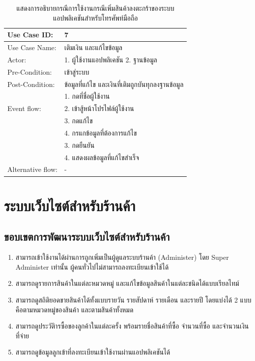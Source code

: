 \begin{table}[htbp]
  \centering
  \caption{แสดงการอธิบายกรณีการใช้งานกรณีเพิ่มสินค้าลงตะกร้าของระบบแอปพลิเคชันสำหรับโทรศัพท์มือถือ}
  \label{tab:example}
  \begin{tabularx}{\textwidth}{|p{3cm}|X|}
    \hline
    \multirow{1}{3cm}{Use Case ID:}      & 7                                   \\
    \hline
    \multirow{1}{3cm}{Use Case Name:}    & เติมเงิน และแก้ไขข้อมูล                  \\
    \hline
    \multirow{1}{3cm}{Actor:}            & 1. ผู้ใช้งานแอปพลิเคชัน 2. ฐานข้อมูล       \\
    \hline
    \multirow{1}{3cm}{Pre-Condition:}    & เข้าสู่ระบบ                            \\
    \hline
    \multirow{1}{3cm}{Post-Condition:}   & ข้อมูลที่แก้ไข และเงินที่เติมถูกบันทุกลงฐานข้อมูล \\
    \hline
    \multirow{3}{3cm}{Event flow:}       & 1. กดที่ชื่อผู้ใช้งาน                      \\
                                         & 2. เข้าสู้หน้าโปรไฟล์ผู้ใช้งาน              \\ & 3. กดแก้ไข \\
                                         & 4. กรแกข้อมูลที่ต้องการแก้ไข              \\ & 3. กดยืนยัน \\
                                         & 4. แสดงผลข้อมูลที่แก้ไขสำเร็จ              \\
    \hline
    \multirow{1}{3cm}{Alternative flow:} & -                                   \\
    \hline
  \end{tabularx}
\end{table}

\section{ระบบเว็บไซต์สำหรับร้านค้า}
\subsection{ขอบเขตการพัฒนาระบบเว็บไซต์สำหรับร้านค้า}
\begin{enumerate}
  \item สามารถเข้าใช้งานได้ผ่านการถูกเพิ่มเป็นผู้ดูแลระบบร้านค้า (Administer) โดย Super Administer เท่านั้น ผู้คนทั่วไปไม่สามารถลงทะเบียนเข้าใช้ได้
  \item สามารถดูรายการสินค้าในแต่ละหมวดหมู่ และแก้ไขข้อมูลสินค้าในแต่ละชนิดได้แบบเรียลไทม์
  \item สามารถดูสถิติยอดขายสินค้าได้ทั้งแบบรายวัน รายสัปดาห์ รายเดือน และรายปี โดยแบ่งได้ 2 แบบ คือตามหมวดหมู่ของสินค้า และตามสินค้าทั้งหมด
  \item สามารถดูประวัติารซื้อของลูกค้าในแต่ละครั้ง พร้อมรายชื่อสินค้าที่ซื้อ จำนวนที่ซื้อ และจำนวนเงินที่จ่าย
  \item สามารถดูข้อมูลลูกเข้าที่ลงทะเบียนเข้าใช้งานผ่านแอปพลิเคชันได้

\end{enumerate}

